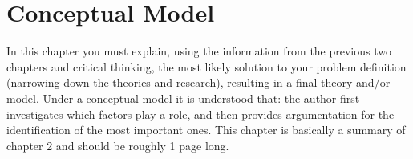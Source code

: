 \chapter{Conceptual Model}\label{chap:conceptual_model}

In this chapter you must explain, using the information from the previous two chapters and critical thinking, the most likely solution to your problem definition (narrowing down the theories and research), resulting in a final theory and/or model. Under a conceptual model it is understood that:  the author first investigates which factors play a role, and then provides argumentation for the identification of the most important ones. This chapter is basically a summary of chapter 2 and should be roughly 1 page long.


